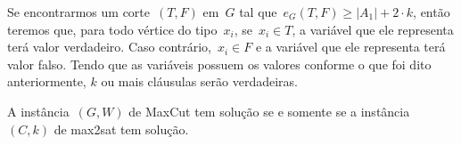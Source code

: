 		\bigskip
		\bigskip

		Se encontrarmos um corte~$(T,F)$ em~$G$ tal 
		que~${e_G(T, F)\ge |A_1| + 2\cdot k}$, 
		então teremos que, para todo vértice do tipo~$x_i$,
		se~${x_i\in T}$, a variável que ele representa terá valor
		verdadeiro. Caso contrário,~${x_i\in F}$ e a variável que ele 
		representa terá valor falso. 
		Tendo que as variáveis possuem os valores conforme
		o que foi dito anteriormente, $k$ ou mais cláusulas serão 
		verdadeiras.

		\bigskip
		\bigskip
		\bigskip
		\bigskip
		\bigskip

		\begin{teo}
			A instância~$(G,W)$ de MaxCut tem solução se e somente se
			a instância~$(C,k)$ de {\sc max2sat} tem solução.
		\end{teo}

